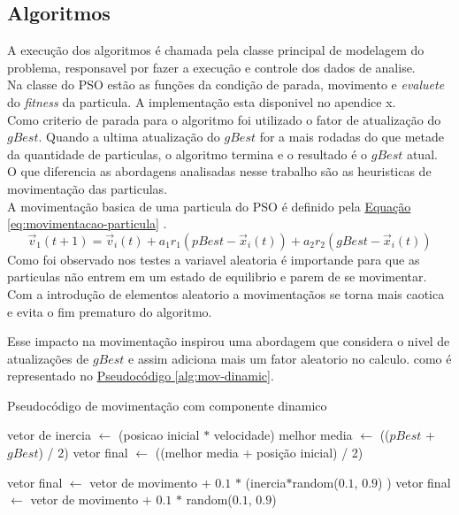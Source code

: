 \subsection{Algoritmos}
A execução dos algoritmos é chamada pela classe principal de modelagem do problema, responsavel por fazer a execução e controle dos dados de analise.\\
%
Na classe do PSO estão as funções da condição de parada, movimento e \textit{evaluete} do \textit{fitness} da particula. A implementação esta disponivel no apendice x.\\ %
%
%
Como criterio de parada para o algoritmo foi utilizado o fator de atualização do $gBest$. Quando a ultima atualização do $gBest$ for a mais rodadas do que metade da quantidade de particulas, o algoritmo termina e o resultado é o $gBest$ atual.\\
\indent O que diferencia as abordagens analisadas nesse trabalho são as heuristicas de movimentação das particulas.\\
A movimentação basica de uma particula do PSO é definido pela
\hyperref[eq:movimentacao-particula]{Equação \ref{eq:movimentacao-particula}}
.
%
\begin{equation} 
    \label{eq:movimentacao-particula}
    \vec v_1(t+1)= \vec v_i(t) + a_1 r_1 (pBest - \vec x_i(t)) + a_2 r_2 (gBest - \vec x_i(t))
\end{equation}
%
Como foi observado nos testes a variavel aleatoria é importande para que as particulas não entrem em um estado de equilibrio e parem de se movimentar. Com a introdução de elementos aleatorio a movimentaçãos se torna mais caotica e evita o fim prematuro do algoritmo.

Esse impacto na movimentação inspirou uma abordagem que considera o nivel de atualizações de $gBest$ e assim adiciona mais um fator aleatorio no calculo. como é representado no 
\hyperref[alg:mov-dinamic]{Pseudocódigo \ref{alg:mov-dinamic}}.
\begin{algorithm}
    \caption{Pseudocódigo de movimentação com componente dinamico}\label{alg:mov-dinamic}
\begin{algorithmic}

\State vetor de inercia $\gets$ (posicao inicial $*$ velocidade)
\State melhor media $\gets$ (($pBest$ + $gBest$) / 2)
\State vetor final $\gets$ ((melhor media + posição inicial) / 2)

    \State vetor final $\gets$ vetor de movimento $+$ $0.1$ $*$ (inercia$*$random($0.1$, $0.9$) )
\Else
    \State vetor final $\gets$ vetor de movimento $+$ $0.1$ $*$ random($0.1$, $0.9$) 
\EndIf    
\end{algorithmic}
\end{algorithm}

